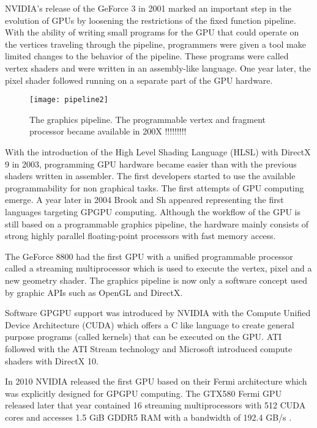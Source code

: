 NVIDIA's release of the GeForce 3 in 2001 marked an important step in the evolution of GPUs by loosening the restrictions of the fixed function pipeline. With the ability of writing small programs for the GPU that could operate on the vertices traveling through the pipeline, programmers were given a tool make limited changes to the behavior of the pipeline. These programs were called vertex shaders and were written in an assembly-like language. One year later, the pixel shader followed running on a separate part of the GPU hardware.

\begin{figure} %
\centering
\texttt{[image: pipeline2]}
\caption{The graphics pipeline. The programmable vertex and fragment processor became available in 200X !!!!!!!!!}
\label{fig:pipeline2}
\end{figure}

With the introduction of the High Level Shading Language (HLSL) with DirectX 9 in 2003, programming GPU hardware became easier than with the previous shaders written in assembler. The first developers started to use the available programmability for non graphical tasks. The first attempts of GPU computing emerge. A year later in 2004 Brook and Sh appeared representing the first languages targeting GPGPU computing.
Although the workflow of the GPU is still based on a programmable graphics pipeline, the hardware mainly consists of strong highly parallel floating-point processors with fast memory access.

The GeForce 8800 had the first GPU with a unified programmable processor called a streaming multiprocessor which is used to execute the vertex, pixel and a new geometry shader. The graphics pipeline is now only a software concept used by graphic APIs such as OpenGL and DirectX.

Software GPGPU support was introduced by NVIDIA with the Compute Unified Device Architecture (CUDA) which offers a C like language to create general purpose programs (called kernels) that can be executed on the GPU. ATI followed with the ATI Stream technology and Microsoft introduced compute shaders with DirectX 10.

In 2010 NVIDIA released the first GPU based on their Fermi architecture which was explicitly designed for GPGPU computing. The GTX580 Fermi GPU released later that year contained 16 streaming multiprocessors with 512 CUDA cores and accesses 1.5 GiB GDDR5 RAM with a bandwidth of 192.4 GB/s \cite{gtx580_spec}.

